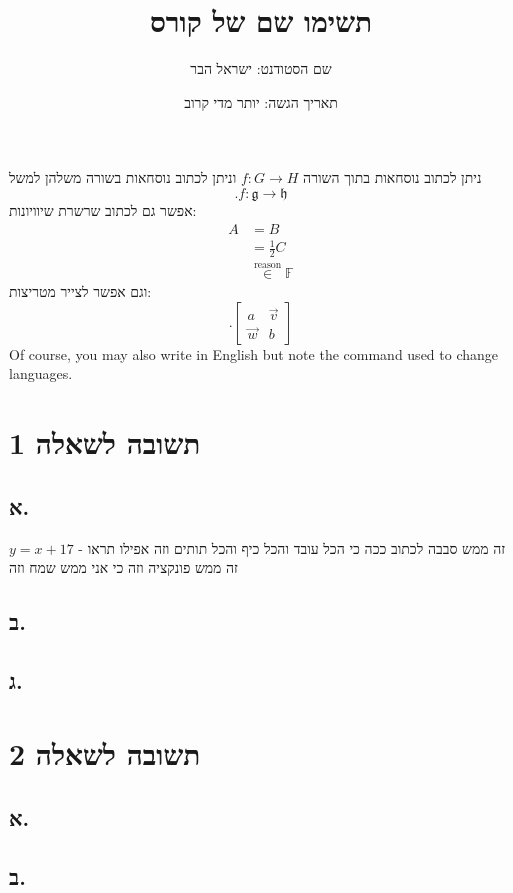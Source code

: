 \documentclass{article}
\title{תשימו שם של קורס}
\author{שם הסטודנט:
ישראל הבר
}
\date{תאריך הגשה:
יותר מדי קרוב
}
\begin{document}
\maketitle

ניתן
לכתוב נוסחאות בתוך השורה 
$f:G\rightarrow H$
וניתן לכתוב נוסחאות בשורה משלהן למשל
$$.f:\mathfrak g \rightarrow \mathfrak h$$
אפשר גם לכתוב שרשרת שיוויונות:
\begin{align*}
A & =B\\
 & =\frac{1}{2}C\\
 & \stackrel{\text{reason}}{\in}\mathbb F
\end{align*}
וגם אפשר לצייר מטריצות:
$$.\left[\begin{array}{cc}
a & \vec{v}\\
\vec{w} & b
\end{array}\right]$$
Of course, you may also write in English but note the command used to change languages.

\section*{תשובה לשאלה 1}

\subsection*{א.}
זה ממש סבבה לכתוב ככה כי הכל עובד והכל כיף והכל תותים וזה אפילו תראו - 
$y=x+17$
זה ממש פונקציה וזה כי אני ממש שמח וזה
\subsection*{ב.}


\subsection*{ג.}




\section*{תשובה לשאלה 2}

\subsection*{א.}


\subsection*{ב.}
\end{document}
